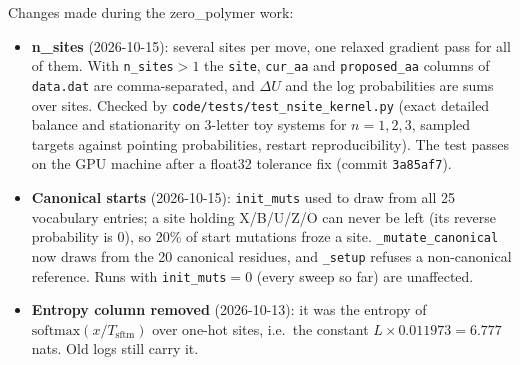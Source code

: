 \documentclass[11pt,a4paper]{article}
\newcommand{\Tsftm}{T_{\mathrm{sftm}}}
\newcommand{\file}[1]{\texttt{#1}}
\begin{document}
Changes made during the zero\_polymer work:
\begin{itemize}
  \item \textbf{n\_sites} (2026-10-15): several sites per move, one relaxed
        gradient pass for all of them. With \texttt{n\_sites}$>1$ the
        \texttt{site}, \texttt{cur\_aa} and \texttt{proposed\_aa} columns of
        \file{data.dat} are comma-separated, and $\Delta U$ and the log
        probabilities are sums over sites. Checked by
        \file{code/tests/test\_nsite\_kernel.py} (exact detailed balance and
        stationarity on 3-letter toy systems for $n=1,2,3$, sampled targets
        against pointing probabilities, restart reproducibility). The test
        passes on the GPU machine after a float32 tolerance fix
        (commit \texttt{3a85af7}).
  \item \textbf{Canonical starts} (2026-10-15): \texttt{init\_muts} used to draw
        from all 25 vocabulary entries; a site holding X/B/U/Z/O can never be
        left (its reverse probability is 0), so 20\% of start mutations froze a
        site. \texttt{\_mutate\_canonical} now draws from the 20 canonical
        residues, and \texttt{\_setup} refuses a non-canonical reference. Runs
        with \texttt{init\_muts}$=0$ (every sweep so far) are unaffected.
  \item \textbf{Entropy column removed} (2026-10-13): it was the entropy of
        $\mathrm{softmax}(x/\Tsftm)$ over one-hot sites, i.e.\ the constant
        $L\times 0.011973=6.777$ nats. Old logs still carry it.
\end{itemize}
\end{document}
